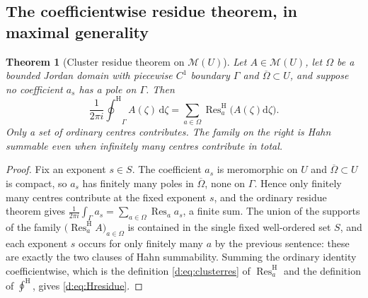 \documentclass[11pt,a4paper]{article}
\numberwithin{equation}{section}
\newtheorem{theorem}{Theorem}[section]
\theoremstyle{definition}
\theoremstyle{remark}
\theoremstyle{plain}
\newcommand{\Mc}{\mathcal M}
\newcommand{\ointH}{{\oint^{\mathrm H}}}
\DeclareMathOperator{\Res}{Res}                 %
\newcommand{\ResH}[1]{\Res^{\mathrm H}_{#1}}    %
\newcommand{\dd}{\mathrm d}
\begin{document}
\subsection{The coefficientwise residue theorem, in maximal generality}
\label{d:sub:Hresidue}

\begin{theorem}[Cluster residue theorem on $\Mc(U)$]
\label{d:thm:Hresidue}
Let $A\in\Mc(U)$, let $\Omega$ be a bounded Jordan domain with
piecewise $C^1$ boundary $\Gamma$ and $\overline\Omega\subset U$, and
suppose no coefficient $a_s$ has a pole on $\Gamma$.  Then
\begin{equation}\label{d:eq:Hresidue}
 \frac1{2\pi i}\ointH_{\Gamma}A(\zeta)\,\dd\zeta
  =\sum_{a\in\Omega}\ResH{a}\bigl(A(\zeta)\dd\zeta\bigr).
\end{equation}
Only a set of ordinary centres contributes.  The family on the right is
Hahn summable even when infinitely many centres contribute in total.
\end{theorem}

\begin{proof}
Fix an exponent $s\in S$.  The coefficient $a_s$ is meromorphic on $U$
and $\overline\Omega\subset U$ is compact, so $a_s$ has finitely many
poles in $\overline\Omega$, none on $\Gamma$.  Hence only finitely many
centres contribute at the fixed exponent $s$, and the ordinary residue
theorem gives
$\frac1{2\pi i}\int_{\Gamma}a_s=\sum_{a\in\Omega}\Res_{a}a_s$, a finite
sum.  The union of the supports of the family
$\bigl(\ResH{a}A\bigr)_{a\in\Omega}$ is contained in the single fixed
well-ordered set $S$, and each exponent $s$ occurs for only finitely
many $a$ by the previous sentence: these are exactly the two clauses of
Hahn summability.  Summing the ordinary identity coefficientwise,
which is the definition \eqref{d:eq:clusterres} of $\ResH{a}$ and the
definition of $\ointH$, gives \eqref{d:eq:Hresidue}.
\end{proof}
\end{document}
